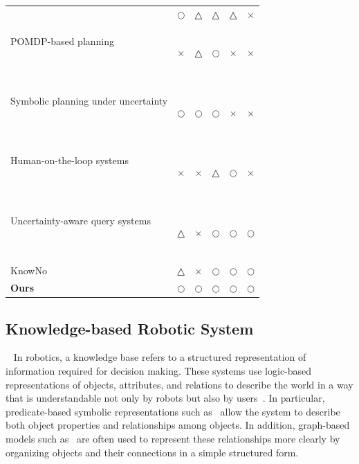 \begin{table}[t]
\begin{tabularx}{\textwidth}{p{}
>{\centering\arraybackslash}X
>{\centering\arraybackslash}X
>{\centering\arraybackslash}X
>{\centering\arraybackslash}X
>{\centering\arraybackslash}X}
~\cite{singh2025adaptbot,zhouenhancing,xu2024p,
wang2025instructrag,kumar2026open,
huang2023voxposer,dai2024optimal,
liu2025delta,paulius2025bootstrapping,
quartey2025verifiably}
& $\bigcirc$
& △
& △
& △
& $\times$ \\

POMDP-based planning

~\cite{somani2013despot,bai2015intention,cramer2021probabilistic,bravo2019use,lauri2016exploration,kim2021plgrim,vanegas2016uav,xiao2019objectsearch,pajarinen2022composition}
& $\times$
& △
& $\bigcirc$
& $\times$
& $\times$ \\


Symbolic planning under uncertainty

~\cite{li2026uncertainty,sanner2010symbolic,zhang2015corpp,serrano2021knowledge,
tang2025tru}
& $\bigcirc$
& $\bigcirc$
& $\bigcirc$
& $\times$
& $\times$ \\

Human-on-the-loop systems

~\cite{scharre2015introduction,
nahavandi2017trusted,
kelly2019hg,mandlekar2020human}
& $\times$
& $\times$
& △
& $\bigcirc$
& $\times$ \\

Uncertainty-aware query systems

~\cite{liang2024introspective,
mullen2025lbap}
& △
& $\times$
& $\bigcirc$
& $\bigcirc$
& $\bigcirc$ \\

KnowNo~\cite{ren2023robots}
& △
& $\times$
& $\bigcirc$
& $\bigcirc$
& $\bigcirc$ \\

\midrule
\textbf{Ours}
& $\bigcirc$
& $\bigcirc$
& $\bigcirc$
& $\bigcirc$
& $\bigcirc$ \\

\bottomrule
\end{tabularx}
\end{table}



\subsection{Knowledge-based Robotic System}~\label{rel:kb}
In robotics, a knowledge base refers to a structured representation of information required for decision making. These systems use logic-based representations of objects, attributes, and relations to describe the world in a way that is understandable not only by robots but also by users~\cite{brachman2004knowledge, russell1995modern}. In particular, predicate-based symbolic representations such as~\cite{fikes1971strips, aeronautiques1998pddl} allow the system to describe both object properties and relationships among objects. In addition, graph-based models such as~\cite{johnson2015image, armeni20193d} are often used to represent these relationships more clearly by organizing objects and their connections in a simple structured form.


